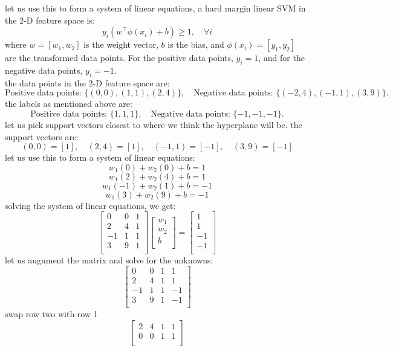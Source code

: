 \documentclass[a3paper,12pt]{article} %
\begin{document}
\begin{enumerate}
let us use this to form a system of linear equations, a hard margin linear SVM in the 2-D feature space is:
\[
y_i(w^\top \phi(x_i) + b) \geq 1, \quad \forall i
\]
where \(w = [w_1, w_2]\) is the weight vector, \(b\) is the bias, and \(\phi(x_i) = [y_1, y_2]\) are the transformed data points. For the positive data points, \(y_i = 1\), and for the negative data points, \(y_i = -1\).
\\ the data points in the 2-D feature space are:
\[
\text{Positive data points: } \{(0, 0), (1, 1), (2, 4)\}, \quad \text{Negative data points: } \{(-2, 4), (-1, 1), (3, 9)\}.
\]
the labels as mentioned above are:
\[
\text{Positive data points: } \{1, 1, 1\}, \quad \text{Negative data points: } \{-1, -1, -1\}.
\]
let us pick support vectors closest to where we think the hyperplane will be. the support vectors are:
\[
(0, 0) = [1], \quad (2, 4) = [1], \quad (-1, 1) = [-1], \quad (3, 9) = [-1]
\]
let us use this to form a system of linear equations:
\[
w_1(0) + w_2(0) + b = 1
\]
\[
w_1(2) + w_2(4) + b = 1
\]
\[
w_1(-1) + w_2(1) + b = -1
\]
\[
w_1(3) + w_2(9) + b = -1
\]
solving the system of linear equations, we get:
\[
\begin{bmatrix}
0 & 0 & 1 \\
2 & 4 & 1 \\
-1 & 1 & 1 \\
3 & 9 & 1 \\
\end{bmatrix}
\begin{bmatrix}
w_1 \\
w_2 \\
b \\\
\end{bmatrix}
=
\begin{bmatrix}
1 \\
1 \\
-1 \\
-1 \\
\end{bmatrix}
\]
let us augument the matrix and solve for the unknowns:
\[
\begin{bmatrix}
0 & 0 & 1 & 1 \\
2 & 4 & 1 & 1 \\
-1 & 1 & 1 & -1 \\
3 & 9 & 1 & -1 \\
\end{bmatrix}
\]
swap row two with row 1
\[
\begin{bmatrix}
2 & 4 & 1 & 1 \\
0 & 0 & 1 & 1 \\

\end{bmatrix}\]
\end{enumerate}
\end{document}
